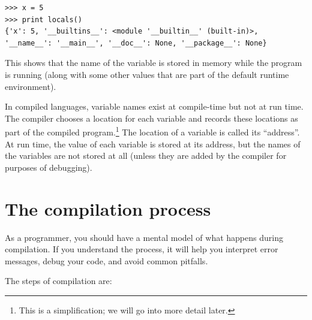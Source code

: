 \documentclass[12pt]{book}
\begin{document}
\begin{verbatim}
>>> x = 5
>>> print locals()
{'x': 5, '__builtins__': <module '__builtin__' (built-in)>,
'__name__': '__main__', '__doc__': None, '__package__': None}
\end{verbatim}

This shows that the name of the variable is stored in memory while
the program is running (along with some other values that are part
of the default runtime environment).

In compiled languages, variable names exist at compile-time but not at
run time.  The compiler chooses a location for each variable and
records these locations as part of the compiled program.\footnote{This
  is a simplification; we will go into more detail later.}  The
location of a variable is called its ``address''.  At run time, the
value of each variable is stored at its address, but the names of the
variables are not stored at all (unless they are added by the compiler
for purposes of debugging).





\section{The compilation process}

As a programmer, you should have a mental model of what happens
during compilation.  If you understand the process, it will help
you interpret error messages, debug your code, and avoid
common pitfalls.

The steps of compilation are:
\end{document}
